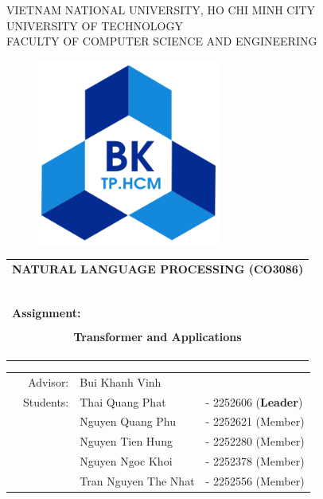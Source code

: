 \documentclass[openany]{mitthesis}
\theoremstyle{definition}
\begin{document}

\begin{titlepage}
\begin{center}
VIETNAM NATIONAL UNIVERSITY, HO CHI MINH CITY \\
UNIVERSITY OF TECHNOLOGY \\
FACULTY OF COMPUTER SCIENCE AND ENGINEERING
\end{center}

\begin{figure}[h!]
\begin{center}
\includegraphics[width=6cm]{hcmut.png}
\end{center}
\end{figure}

\begin{center}
\begin{tabular}{c}
\multicolumn{1}{l}{\textbf{{\Large NATURAL LANGUAGE PROCESSING (CO3086)}}}\\
~~\\
\hline
\\
\multicolumn{1}{l}{\textbf{{\Large Assignment:}}}\\
\\
\textbf{{\Huge Transformer and Applications}}\\
\\
\textbf{{\Huge}}\\
\\
\hline
\end{tabular}
\end{center}

\vspace{1cm}

\begin{table}[h]
\begin{tabular}{rrll}
\hspace{5 cm} & Advisor: & Bui Khanh Vinh & \\
& Students: & Thai Quang Phat &- 2252606 (\textbf{Leader}) \\
& & Nguyen Quang Phu &- 2252621 (Member) \\
& & Nguyen Tien  Hung &- 2252280 (Member) \\
& & Nguyen Ngoc Khoi &- 2252378 (Member) \\
& & Tran Nguyen The Nhat &- 2252556 (Member) \\
\end{tabular}
\end{table}


\end{titlepage}
\end{document}
